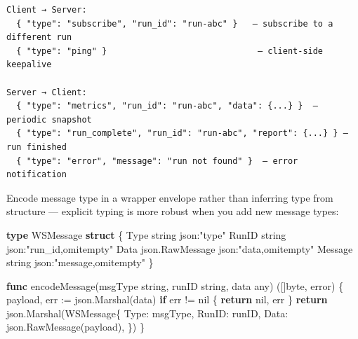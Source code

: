 \documentclass[
]{article}
\newenvironment{Shaded}{}{}
\newcommand{\ControlFlowTok}[1]{\textcolor[rgb]{0.00,0.44,0.13}{\textbf{#1}}}
\newcommand{\DataTypeTok}[1]{\textcolor[rgb]{0.56,0.13,0.00}{#1}}
\newcommand{\KeywordTok}[1]{\textcolor[rgb]{0.00,0.44,0.13}{\textbf{#1}}}
\newcommand{\NormalTok}[1]{#1}
\newcommand{\OperatorTok}[1]{\textcolor[rgb]{0.40,0.40,0.40}{#1}}
\newcommand{\OtherTok}[1]{\textcolor[rgb]{0.00,0.44,0.13}{#1}}
\newcommand{\StringTok}[1]{\textcolor[rgb]{0.25,0.44,0.63}{#1}}
\begin{document}
\begin{verbatim}
Client → Server:
  { "type": "subscribe", "run_id": "run-abc" }   — subscribe to a different run
  { "type": "ping" }                              — client-side keepalive

Server → Client:
  { "type": "metrics", "run_id": "run-abc", "data": {...} }  — periodic snapshot
  { "type": "run_complete", "run_id": "run-abc", "report": {...} } — run finished
  { "type": "error", "message": "run not found" }  — error notification
\end{verbatim}

Encode message type in a wrapper envelope rather than inferring type
from structure --- explicit typing is more robust when you add new
message types:

\begin{Shaded}
\begin{Highlighting}[]
\KeywordTok{type}\NormalTok{ WSMessage }\KeywordTok{struct} \OperatorTok{\{}
\NormalTok{    Type    }\DataTypeTok{string}          \StringTok{\textasciigrave{}json:"type"\textasciigrave{}}
\NormalTok{    RunID   }\DataTypeTok{string}          \StringTok{\textasciigrave{}json:"run\_id,omitempty"\textasciigrave{}}
\NormalTok{    Data    json}\OperatorTok{.}\NormalTok{RawMessage }\StringTok{\textasciigrave{}json:"data,omitempty"\textasciigrave{}}
\NormalTok{    Message }\DataTypeTok{string}          \StringTok{\textasciigrave{}json:"message,omitempty"\textasciigrave{}}
\OperatorTok{\}}

\KeywordTok{func}\NormalTok{ encodeMessage}\OperatorTok{(}\NormalTok{msgType }\DataTypeTok{string}\OperatorTok{,}\NormalTok{ runID }\DataTypeTok{string}\OperatorTok{,}\NormalTok{ data any}\OperatorTok{)} \OperatorTok{([]}\DataTypeTok{byte}\OperatorTok{,} \DataTypeTok{error}\OperatorTok{)} \OperatorTok{\{}
\NormalTok{    payload}\OperatorTok{,}\NormalTok{ err }\OperatorTok{:=}\NormalTok{ json}\OperatorTok{.}\NormalTok{Marshal}\OperatorTok{(}\NormalTok{data}\OperatorTok{)}
    \ControlFlowTok{if}\NormalTok{ err }\OperatorTok{!=} \OtherTok{nil} \OperatorTok{\{}
        \ControlFlowTok{return} \OtherTok{nil}\OperatorTok{,}\NormalTok{ err}
    \OperatorTok{\}}
    \ControlFlowTok{return}\NormalTok{ json}\OperatorTok{.}\NormalTok{Marshal}\OperatorTok{(}\NormalTok{WSMessage}\OperatorTok{\{}
\NormalTok{        Type}\OperatorTok{:}\NormalTok{  msgType}\OperatorTok{,}
\NormalTok{        RunID}\OperatorTok{:}\NormalTok{ runID}\OperatorTok{,}
\NormalTok{        Data}\OperatorTok{:}\NormalTok{  json}\OperatorTok{.}\NormalTok{RawMessage}\OperatorTok{(}\NormalTok{payload}\OperatorTok{),}
    \OperatorTok{\})}
\OperatorTok{\}}
\end{Highlighting}
\end{Shaded}
\end{document}
